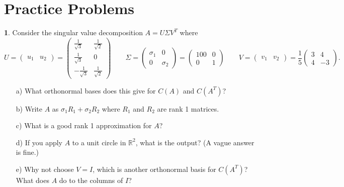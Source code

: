\documentclass{article}
\theoremstyle{definition}
\newtheorem{prob}{}
\begin{document}
\section*{Practice Problems}
\begin{prob}
	Consider the singular value decomposition $A= U \Sigma V^T$ where
	\[U =\begin{pmatrix}
		u_1 & u_2
	\end{pmatrix}= \begin{pmatrix}
		\frac{1}{\sqrt{3}} & \frac{1}{\sqrt{2}} \\
		\frac{1}{\sqrt{3}}  & 0 \\
		-\frac{1}{\sqrt{3}} & \frac{1}{\sqrt{2}}
	\end{pmatrix} \qquad 
\Sigma= \begin{pmatrix}
	\sigma_1 & 0\\
	0 & \sigma_2
\end{pmatrix}= \begin{pmatrix}
	100 & 0\\
	0 & 1
\end{pmatrix} \qquad
V= \begin{pmatrix}
	v_1 & v_2
\end{pmatrix}= \frac{1}{5} \begin{pmatrix}
3 & 4\\4 &-3
\end{pmatrix}.\]
\begin{itemize}
	\item[a)] What orthonormal bases does this give for $C(A)$ and $C(A^T)$?
	\item[b)] Write $A$ as $\sigma_1 R_1 + \sigma_2 R_2$ where $R_1$ and $R_2$ are rank 1 matrices.
	\item[c)] What is a good rank 1 approximation for $A$?
	\item[d)] If you apply $A$ to a unit circle in $\mathbb{R}^2$, what is the output? (A vague answer is fine.)
	\item[e)] Why not choose $V=I$, which is another orthonormal basis for $C(A^T)$? What does $A$ do to the columns of $I$?
\end{itemize}
\end{prob}
\end{document}
